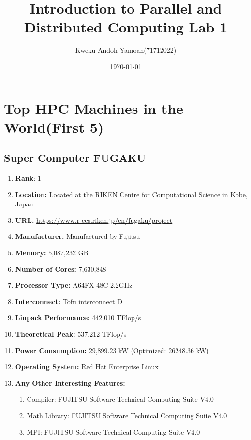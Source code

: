 \documentclass[12pt, a4paper, fleqn, titlepage]{article}
\title{Introduction to Parallel and Distributed Computing Lab 1}
\author{Kweku Andoh Yamoah(71712022)}
\date{\today}
\begin{document}
\maketitle
\justify
\section{Top HPC Machines in the World(First 5)}
    \subsection{Super Computer FUGAKU}
        \begin{flushleft}
            \begin{enumerate}[\textbullet]
                \item \textbf{Rank}: 1
                \item \textbf{Location:} 
                    Located at the RIKEN Centre for Computational Science in Kobe, Japan
                \item \textbf{URL:} 
                    \url{https://www.r-ccs.riken.jp/en/fugaku/project}
                \item \textbf{Manufacturer:} Manufactured by Fujitsu
                \item \textbf{Memory:} 5,087,232 GB
                \item \textbf{Number of Cores:} 7,630,848
                \item \textbf{Processor Type:} A64FX 48C 2.2GHz
                \item \textbf{Interconnect:} Tofu interconnect D
                \item \textbf{Linpack Performance:} 442,010 TFlop/s
                \item \textbf{Theoretical Peak:} 537,212 TFlop/s
                \item \textbf{Power Consumption:} 29,899.23 kW (Optimized: 26248.36 kW)
                \item \textbf{Operating System:} Red Hat Enterprise Linux
                \item \textbf{Any Other Interesting Features:}
                    \begin{enumerate}
                        \item Compiler: FUJITSU Software Technical Computing Suite V4.0
                        \item Math Library: FUJITSU Software Technical Computing Suite V4.0
                        \item MPI: FUJITSU Software Technical Computing Suite V4.0
                    \end{enumerate}
            \end{enumerate}
        \end{flushleft}
\end{document}
